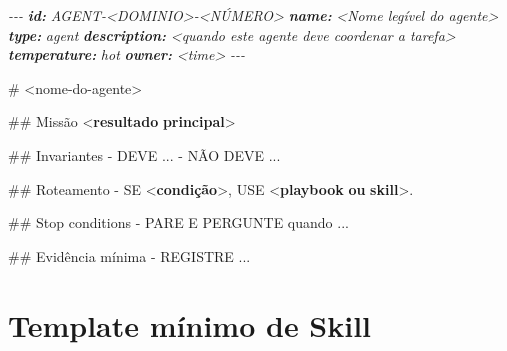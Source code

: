 \documentclass[
  10pt,
  a4paper,
  oneside]{book}
\newenvironment{Shaded}{}{}
\newcommand{\AnnotationTok}[1]{\textcolor[rgb]{0.38,0.63,0.69}{\textbf{\textit{#1}}}}
\newcommand{\CommentTok}[1]{\textcolor[rgb]{0.38,0.63,0.69}{\textit{#1}}}
\newcommand{\DataTypeTok}[1]{\textcolor[rgb]{0.56,0.13,0.00}{#1}}
\newcommand{\ErrorTok}[1]{\textcolor[rgb]{1.00,0.00,0.00}{\textbf{#1}}}
\newcommand{\FunctionTok}[1]{\textcolor[rgb]{0.02,0.16,0.49}{#1}}
\newcommand{\KeywordTok}[1]{\textcolor[rgb]{0.00,0.44,0.13}{\textbf{#1}}}
\newcommand{\NormalTok}[1]{#1}
\newcommand{\SpecialStringTok}[1]{\textcolor[rgb]{0.73,0.40,0.53}{#1}}
\begin{document}
\begin{Shaded}
\begin{Highlighting}[]
\CommentTok{{-}{-}{-}}
\AnnotationTok{id:}\CommentTok{ AGENT{-}\textless{}DOMINIO\textgreater{}{-}\textless{}NÚMERO\textgreater{}}
\AnnotationTok{name:}\CommentTok{ \textless{}Nome legível do agente\textgreater{}}
\AnnotationTok{type:}\CommentTok{ agent}
\AnnotationTok{description:}\CommentTok{ \textless{}quando este agente deve coordenar a tarefa\textgreater{}}
\AnnotationTok{temperature:}\CommentTok{ hot}
\AnnotationTok{owner:}\CommentTok{ \textless{}time\textgreater{}}
\CommentTok{{-}{-}{-}}

\FunctionTok{\# \textless{}nome{-}do{-}agente\textgreater{}}

\FunctionTok{\#\# Missão}
\DataTypeTok{\textless{}}\KeywordTok{resultado} \ErrorTok{principal}\DataTypeTok{\textgreater{}}

\FunctionTok{\#\# Invariantes}
\SpecialStringTok{{-} }\NormalTok{DEVE ...}
\SpecialStringTok{{-} }\NormalTok{NÃO DEVE ...}

\FunctionTok{\#\# Roteamento}
\SpecialStringTok{{-} }\NormalTok{SE }\DataTypeTok{\textless{}}\KeywordTok{condição}\DataTypeTok{\textgreater{}}\NormalTok{, USE }\DataTypeTok{\textless{}}\KeywordTok{playbook} \ErrorTok{ou} \ErrorTok{skill}\DataTypeTok{\textgreater{}}\NormalTok{.}

\FunctionTok{\#\# Stop conditions}
\SpecialStringTok{{-} }\NormalTok{PARE E PERGUNTE quando ...}

\FunctionTok{\#\# Evidência mínima}
\SpecialStringTok{{-} }\NormalTok{REGISTRE ...}
\end{Highlighting}
\end{Shaded}

\hypertarget{template-muxednimo-de-skill}{%
\section{Template mínimo de Skill}\label{template-muxednimo-de-skill}}
\end{document}
